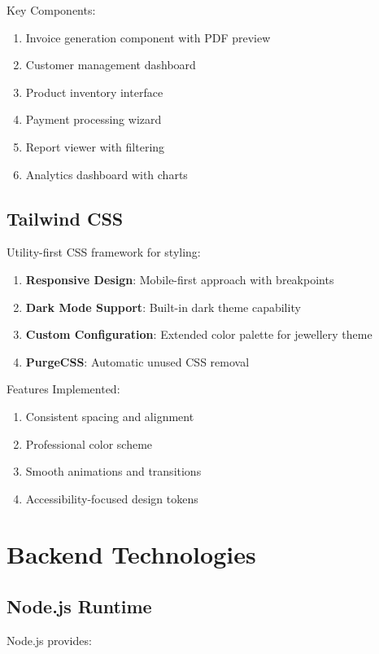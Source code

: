 \documentclass[12pt,a4paper]{report}
\begin{document}
Key Components:
\begin{enumerate}[label=\roman*)]
    \item Invoice generation component with PDF preview
    \item Customer management dashboard
    \item Product inventory interface
    \item Payment processing wizard
    \item Report viewer with filtering
    \item Analytics dashboard with charts
\end{enumerate}

\subsection{Tailwind CSS}

Utility-first CSS framework for styling:

\begin{enumerate}[label=\roman*)]
    \item \textbf{Responsive Design}: Mobile-first approach with breakpoints
    \item \textbf{Dark Mode Support}: Built-in dark theme capability
    \item \textbf{Custom Configuration}: Extended color palette for jewellery theme
    \item \textbf{PurgeCSS}: Automatic unused CSS removal
\end{enumerate}

Features Implemented:
\begin{enumerate}[label=\roman*)]
    \item Consistent spacing and alignment
    \item Professional color scheme
    \item Smooth animations and transitions
    \item Accessibility-focused design tokens
\end{enumerate}

\section{Backend Technologies}

\subsection{Node.js Runtime}

Node.js provides:
\end{document}
